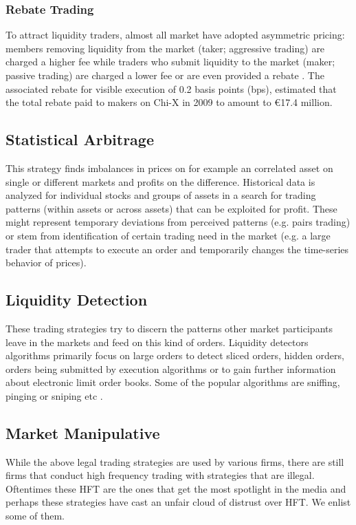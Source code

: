 \documentclass[12pt,a4paper]{article}
\numberwithin{equation}{section}
\numberwithin{figure}{section}
\numberwithin{table}{section}
\begin{document}
\subsubsection{Rebate Trading} 
To attract liquidity traders, almost all market have adopted asymmetric pricing: members removing
liquidity from the market (taker; aggressive trading) are charged a higher fee while traders
who submit liquidity to the market (maker; passive trading) are charged a lower fee or are
even provided a rebate \citep{gomer2011}. The associated rebate for visible execution of 0.2 basis points (bps), \citet{gomer2011} estimated that the total rebate paid to makers on Chi-X in 2009 to amount to €17.4 million.

\subsection{ Statistical Arbitrage}
This strategy finds imbalances in prices on for example an correlated asset on single or different markets and profits on the difference. Historical data is analyzed for individual stocks and groups of assets in a search for trading patterns (within assets or across assets) that can be exploited for profit. These might represent temporary deviations from perceived patterns (e.g. pairs trading) or stem from identification of certain trading need in the market (e.g. a large trader that attempts to execute an order and temporarily changes the time-series behavior of prices).
\subsection{Liquidity Detection}
These trading strategies try to discern the patterns other market participants leave in the markets and feed on this kind of orders. Liquidity detectors algorithms primarily focus on large orders to detect sliced orders, hidden orders, orders being submitted by execution algorithms or to gain further information about electronic limit order books. Some of the popular algorithms are sniffing, pinging or sniping etc \citep{gomer2011}.

\subsection{Market Manipulative}
While the above legal trading strategies are used by various firms, there are still firms that conduct high frequency trading with strategies that are illegal. Oftentimes these HFT are the ones that get the most spotlight in the media and perhaps these strategies have cast an unfair cloud of distrust over HFT. We enlist some of them.
\end{document}
